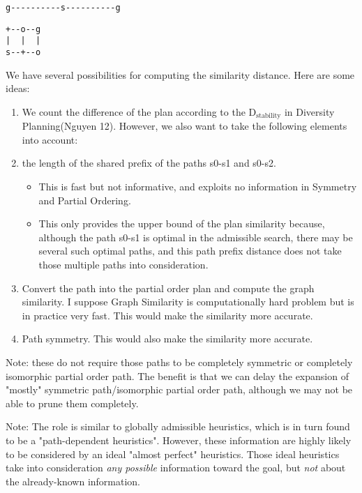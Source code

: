 \begin{verbatim}
g----------s----------g
\end{verbatim}

\begin{verbatim}
+--o--g
|  |  |
s--+--o
\end{verbatim}

We have several possibilities for computing the similarity distance. Here
are some ideas:

\begin{enumerate}
\item We count the difference of the plan according to the D\(_{\text{stability}}\) in
Diversity Planning(Nguyen 12). However, we also want to take the following elements
into account:
\item the length of the shared prefix of the paths s0-s1 and s0-s2.
\begin{itemize}
\item This is fast but not informative, and exploits no information in
Symmetry and Partial Ordering.
\item This only provides the upper bound of the plan similarity because,
although the path s0-s1 is optimal in the admissible search, there
may be several such optimal paths, and this path prefix distance
does not take those multiple paths into consideration.
\end{itemize}
\item Convert the path into the partial order plan and compute the graph
similarity. I suppose Graph Similarity is computationally hard problem
but is in practice very fast. This would make the similarity
more accurate.
\item Path symmetry. This would also make the similarity more accurate.
\end{enumerate}

Note: these do not require those paths to be completely symmetric or
completely isomorphic partial order path. The benefit is that we can delay
the expansion of "mostly" symmetric path/isomorphic partial order path,
although we may not be able to prune them completely.

Note: The role is similar to globally admissible heuristics, which is in turn
found to be a "path-dependent heuristics". However, these information are
highly likely to be considered by an ideal "almost perfect" heuristics.
Those ideal heuristics take into consideration \emph{any possible} information
toward the goal, but \emph{not} about the already-known information.

